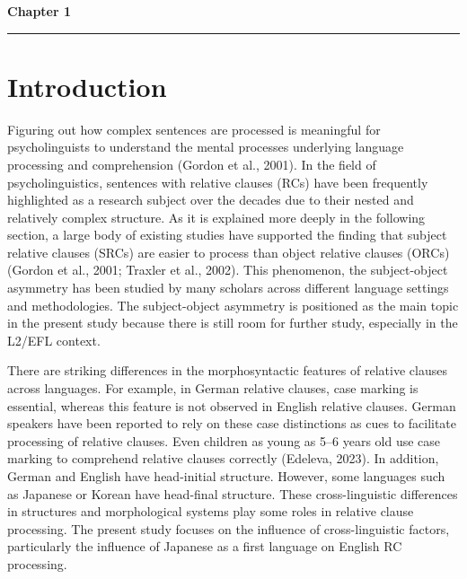\documentclass[
]{article}
\begin{document}
\clearpage
{}
\setcounter{page}{8}

\thispagestyle{empty}
\vspace*{-1cm}
\begin{flushleft}
\Huge \textbf{Chapter 1}
\end{flushleft}
\vspace{0.3cm}

\noindent

\rule{\linewidth}{0.6pt}

\pagestyle{fancy}
\fancyhf{}  
\fancyhead[L]{\nouppercase{\leftmark}}
\fancyfoot[C]{\thepage}

\section{Introduction}\label{introduction}

Figuring out how complex sentences are processed is meaningful for
psycholinguists to understand the mental processes underlying language
processing and comprehension (Gordon et al., 2001). In the field of
psycholinguistics, sentences with relative clauses (RCs) have been
frequently highlighted as a research subject over the decades due to
their nested and relatively complex structure. As it is explained more
deeply in the following section, a large body of existing studies have
supported the finding that subject relative clauses (SRCs) are easier to
process than object relative clauses (ORCs) (Gordon et al., 2001;
Traxler et al., 2002). This phenomenon, the subject-object asymmetry has
been studied by many scholars across different language settings and
methodologies. The subject-object asymmetry is positioned as the main
topic in the present study because there is still room for further
study, especially in the L2/EFL context.

There are striking differences in the morphosyntactic features of
relative clauses across languages. For example, in German relative
clauses, case marking is essential, whereas this feature is not observed
in English relative clauses. German speakers have been reported to rely
on these case distinctions as cues to facilitate processing of relative
clauses. Even children as young as 5--6 years old use case marking to
comprehend relative clauses correctly (Edeleva, 2023). In addition,
German and English have head-initial structure. However, some languages
such as Japanese or Korean have head-final structure. These
cross-linguistic differences in structures and morphological systems
play some roles in relative clause processing. The present study focuses
on the influence of cross-linguistic factors, particularly the influence
of Japanese as a first language on English RC processing.
\end{document}
